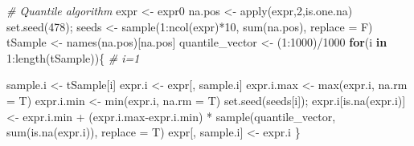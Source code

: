 \documentclass[
  12pt,
]{book}
\newenvironment{Shaded}{\begin{snugshade}}{\end{snugshade}}
\newcommand{\AttributeTok}[1]{\textcolor[rgb]{0.77,0.63,0.00}{#1}}
\newcommand{\CommentTok}[1]{\textcolor[rgb]{0.56,0.35,0.01}{\textit{#1}}}
\newcommand{\ControlFlowTok}[1]{\textcolor[rgb]{0.13,0.29,0.53}{\textbf{#1}}}
\newcommand{\DecValTok}[1]{\textcolor[rgb]{0.00,0.00,0.81}{#1}}
\newcommand{\FunctionTok}[1]{\textcolor[rgb]{0.00,0.00,0.00}{#1}}
\newcommand{\NormalTok}[1]{#1}
\newcommand{\OtherTok}[1]{\textcolor[rgb]{0.56,0.35,0.01}{#1}}
\newcommand{\SpecialCharTok}[1]{\textcolor[rgb]{0.00,0.00,0.00}{#1}}
\begin{document}
\begin{Shaded}
\begin{Highlighting}[]

\CommentTok{\# Quantile algorithm}
\NormalTok{expr }\OtherTok{\textless{}{-}}\NormalTok{ expr0}
\NormalTok{na.pos }\OtherTok{\textless{}{-}} \FunctionTok{apply}\NormalTok{(expr,}\DecValTok{2}\NormalTok{,is.one.na)}
\FunctionTok{set.seed}\NormalTok{(}\DecValTok{478}\NormalTok{); seeds }\OtherTok{\textless{}{-}} \FunctionTok{sample}\NormalTok{(}\DecValTok{1}\SpecialCharTok{:}\FunctionTok{ncol}\NormalTok{(expr)}\SpecialCharTok{*}\DecValTok{10}\NormalTok{, }\FunctionTok{sum}\NormalTok{(na.pos), }\AttributeTok{replace =}\NormalTok{ F)}
\NormalTok{tSample }\OtherTok{\textless{}{-}} \FunctionTok{names}\NormalTok{(na.pos)[na.pos]}
\NormalTok{quantile\_vector }\OtherTok{\textless{}{-}}\NormalTok{ (}\DecValTok{1}\SpecialCharTok{:}\DecValTok{1000}\NormalTok{)}\SpecialCharTok{/}\DecValTok{1000}
\ControlFlowTok{for}\NormalTok{(i }\ControlFlowTok{in} \DecValTok{1}\SpecialCharTok{:}\FunctionTok{length}\NormalTok{(tSample))\{ }\CommentTok{\# i=1}
  
\NormalTok{  sample.i }\OtherTok{\textless{}{-}}\NormalTok{ tSample[i]}
\NormalTok{  expr.i }\OtherTok{\textless{}{-}}\NormalTok{ expr[, sample.i]}
\NormalTok{  expr.i.max }\OtherTok{\textless{}{-}} \FunctionTok{max}\NormalTok{(expr.i, }\AttributeTok{na.rm =}\NormalTok{ T)}
\NormalTok{  expr.i.min }\OtherTok{\textless{}{-}} \FunctionTok{min}\NormalTok{(expr.i, }\AttributeTok{na.rm =}\NormalTok{ T)}
  \FunctionTok{set.seed}\NormalTok{(seeds[i]);}
\NormalTok{  expr.i[}\FunctionTok{is.na}\NormalTok{(expr.i)] }\OtherTok{\textless{}{-}}
\NormalTok{    expr.i.min }\SpecialCharTok{+}
\NormalTok{    (expr.i.max}\SpecialCharTok{{-}}\NormalTok{expr.i.min) }\SpecialCharTok{*} \FunctionTok{sample}\NormalTok{(quantile\_vector,}
                                     \FunctionTok{sum}\NormalTok{(}\FunctionTok{is.na}\NormalTok{(expr.i)),}
                                     \AttributeTok{replace =}\NormalTok{ T)}
\NormalTok{  expr[, sample.i] }\OtherTok{\textless{}{-}}\NormalTok{ expr.i}
\NormalTok{\}}
  


\end{Highlighting}
\end{Shaded}
\end{document}
